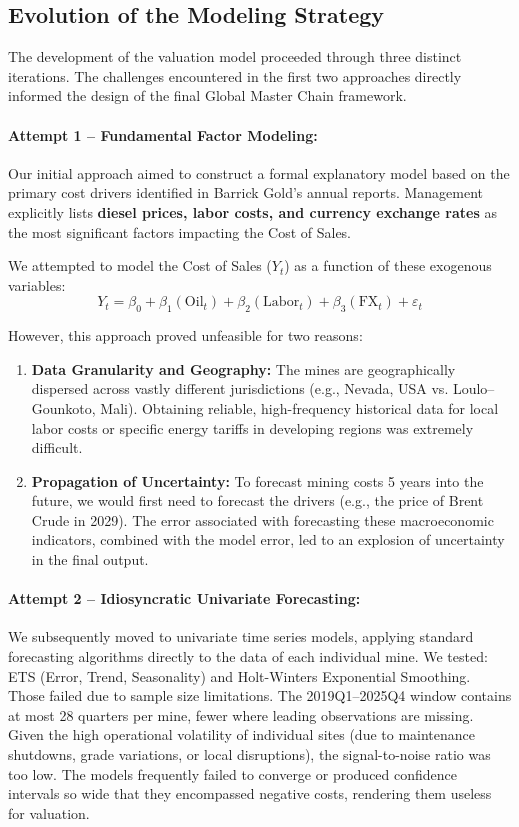 \subsection{Evolution of the Modeling Strategy}
The development of the valuation model proceeded through three distinct iterations. The challenges encountered in the first two approaches directly informed the design of the final Global Master Chain framework.

\paragraph{Attempt 1 -- Fundamental Factor Modeling:}
Our initial approach aimed to construct a formal explanatory model based on the primary cost drivers identified in Barrick Gold's annual reports. Management explicitly lists \textbf{diesel prices, labor costs, and currency exchange rates} as the most significant factors impacting the Cost of Sales.

We attempted to model the Cost of Sales ($Y_t$) as a function of these exogenous variables:
\[ Y_t = \beta_0 + \beta_1(\text{Oil}_t) + \beta_2(\text{Labor}_t) + \beta_3(\text{FX}_t) + \varepsilon_t \]

However, this approach proved unfeasible for two reasons:
\begin{enumerate}
    \item \textbf{Data Granularity and Geography:} The mines are geographically dispersed across vastly different jurisdictions (e.g., Nevada, USA vs. Loulo--Gounkoto, Mali). Obtaining reliable, high-frequency historical data for local labor costs or specific energy tariffs in developing regions was extremely difficult.
    \item \textbf{Propagation of Uncertainty:} To forecast mining costs 5 years into the future, we would first need to forecast the drivers (e.g., the price of Brent Crude in 2029). The error associated with forecasting these macroeconomic indicators, combined with the model error, led to an explosion of uncertainty in the final output.
\end{enumerate}

\paragraph{Attempt 2 -- Idiosyncratic Univariate Forecasting:}
We subsequently moved to univariate time series models, applying standard forecasting algorithms directly to the data of each individual mine. We tested: ETS (Error, Trend, Seasonality) and Holt-Winters Exponential Smoothing.\\
Those failed due to sample size limitations. The 2019Q1--2025Q4 window contains at most 28 quarters per mine, fewer where leading observations are missing. Given the high operational volatility of individual sites (due to maintenance shutdowns, grade variations, or local disruptions), the signal-to-noise ratio was too low. The models frequently failed to converge or produced confidence intervals so wide that they encompassed negative costs, rendering them useless for valuation.

